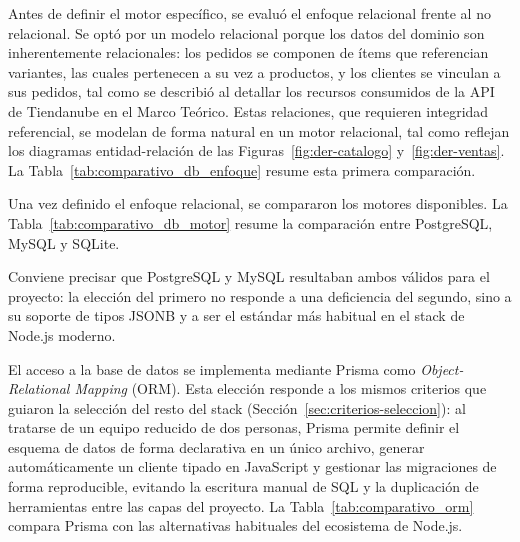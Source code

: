 Antes de definir el motor específico, se evaluó el enfoque relacional frente al no relacional. Se optó por un modelo relacional porque los datos del dominio son inherentemente relacionales: los pedidos se componen de ítems que referencian variantes, las cuales pertenecen a su vez a productos, y los clientes se vinculan a sus pedidos, tal como se describió al detallar los recursos consumidos de la API de Tiendanube en el Marco Teórico. Estas relaciones, que requieren integridad referencial, se modelan de forma natural en un motor relacional, tal como reflejan los diagramas entidad-relación de las Figuras~\ref{fig:der-catalogo} y~\ref{fig:der-ventas}. La Tabla~\ref{tab:comparativo_db_enfoque} resume esta primera comparación.

Una vez definido el enfoque relacional, se compararon los motores disponibles. La Tabla~\ref{tab:comparativo_db_motor} resume la comparación entre PostgreSQL, MySQL y SQLite.

Conviene precisar que PostgreSQL y MySQL resultaban ambos válidos para el proyecto: la elección del primero no responde a una deficiencia del segundo, sino a su soporte de tipos JSONB y a ser el estándar más habitual en el stack de Node.js moderno.

El acceso a la base de datos se implementa mediante Prisma como \emph{Object-Relational Mapping} (ORM). Esta elección responde a los mismos criterios que guiaron la selección del resto del stack (Sección~\ref{sec:criterios-seleccion}): al tratarse de un equipo reducido de dos personas, Prisma permite definir el esquema de datos de forma declarativa en un único archivo, generar automáticamente un cliente tipado en JavaScript y gestionar las migraciones de forma reproducible, evitando la escritura manual de SQL y la duplicación de herramientas entre las capas del proyecto. La Tabla~\ref{tab:comparativo_orm} compara Prisma con las alternativas habituales del ecosistema de Node.js.

